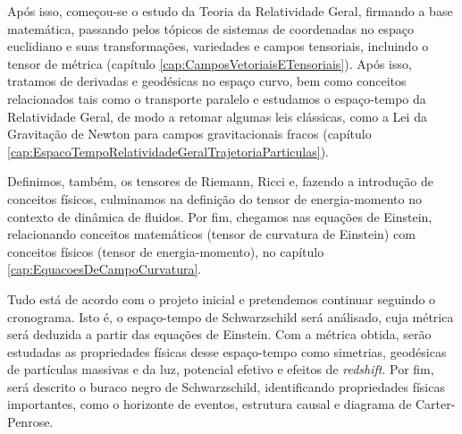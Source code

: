 Após isso, começou-se o estudo da Teoria da Relatividade Geral, firmando a base matemática, passando pelos tópicos de sistemas de coordenadas no espaço euclidiano e suas transformações, variedades e campos tensoriais, incluindo o tensor de métrica (capítulo \ref{cap:CamposVetoriaisETensoriais}). Após isso, tratamos de derivadas e geodésicas no espaço curvo, bem como conceitos relacionados tais como o transporte paralelo e estudamos o espaço-tempo da Relatividade Geral, de modo a retomar algumas leis clássicas, como a Lei da Gravitação de Newton para campos gravitacionais fracos (capítulo \ref{cap:EspacoTempoRelatividadeGeralTrajetoriaParticulas}).

Definimos, também, os tensores de Riemann, Ricci e, fazendo a introdução de conceitos físicos, culminamos na definição do tensor de energia-momento no contexto de dinâmica de fluidos. Por fim, chegamos nas equações de Einstein, relacionando conceitos matemáticos (tensor de curvatura de Einstein) com conceitos físicos (tensor de energia-momento), no capítulo \ref{cap:EquacoesDeCampoCurvatura}.

Tudo está de acordo com o projeto inicial e pretendemos continuar seguindo o cronograma. Isto é, o espaço-tempo de Schwarzschild será análisado, cuja métrica será deduzida a partir das equações de Einstein. Com a métrica obtida, serão estudadas as propriedades físicas desse espaço-tempo como simetrias, geodésicas de partículas massivas e da luz, potencial efetivo e efeitos de \textit{redshift}. Por fim, será descrito o buraco negro de Schwarzschild, identificando propriedades físicas importantes, como o horizonte de eventos, estrutura causal e diagrama de Carter-Penrose.


